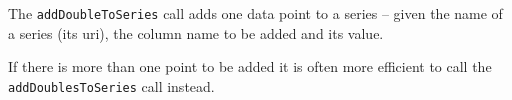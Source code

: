 The \verb+addDoubleToSeries+ call adds one data point to a series -- given the name of a series (its uri),
the column name to be added and its value.

If there is more than one point to be added it is often more efficient to call the \verb+addDoublesToSeries+ call
instead.
